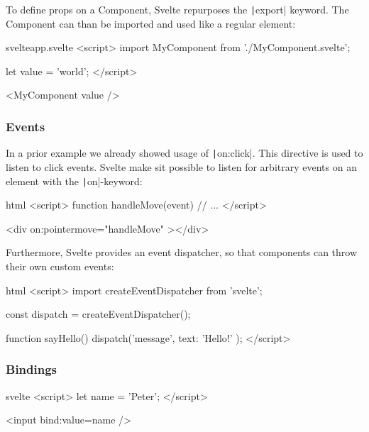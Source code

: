 To define props on a Component, Svelte repurposes the \texttt|export| keyword. The Component can than be imported and used like a regular element:

\begin{myminted}{svelte}{app.svelte}
<script>
    import MyComponent from './MyComponent.svelte';

    let value = 'world';
</script>

<MyComponent {value} />
\end{myminted}

\subsubsection{Events}


In a prior example we already showed usage of \texttt|on:click|. This directive is used to listen to click events. Svelte make sit possible to listen for arbitrary events on an element with the \texttt|on|-keyword:

\begin{myminted}[highlightlines={7}]{html}{}
<script>
    function handleMove(event) {
        // ...
    }
</script>

<div on:pointermove="{handleMove}" ></div>
\end{myminted}

Furthermore, Svelte provides an event dispatcher, so that components can throw their own custom events:

\begin{myminted}{html}{}
<script>
    import { createEventDispatcher } from 'svelte';

    const dispatch = createEventDispatcher();

    function sayHello() {
        dispatch('message', {
            text: 'Hello!'
        });
    }
</script>
\end{myminted}

\subsubsection{Bindings}


\begin{myminted}{svelte}{}
<script>
    let name = 'Peter';
</script>

<input bind:value={name} />
\end{myminted}

